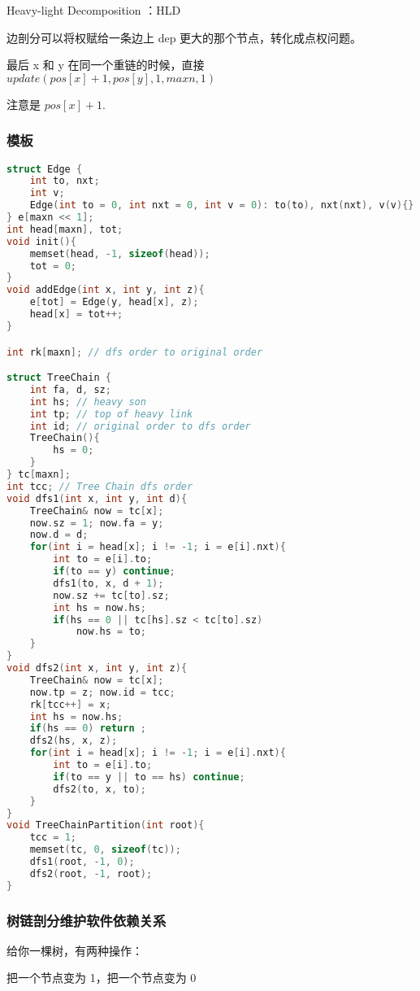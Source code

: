 Heavy-light Decomposition ：HLD

边剖分可以将权赋给一条边上 dep 更大的那个节点，转化成点权问题。

最后 x 和 y 在同一个重链的时候，直接 $update(pos[x] + 1 ,  pos[y], 1,  maxn, 1)$

注意是 $pos[x] + 1$.

\subsubsection{模板}

\begin{lstlisting}[language=C++]
struct Edge {
    int to, nxt;
    int v;
    Edge(int to = 0, int nxt = 0, int v = 0): to(to), nxt(nxt), v(v){}
} e[maxn << 1];
int head[maxn], tot;
void init(){
    memset(head, -1, sizeof(head));
    tot = 0;
}
void addEdge(int x, int y, int z){
    e[tot] = Edge(y, head[x], z);
    head[x] = tot++;
}

int rk[maxn]; // dfs order to original order

struct TreeChain {
    int fa, d, sz;
    int hs; // heavy son
    int tp; // top of heavy link
    int id; // original order to dfs order
    TreeChain(){
        hs = 0;
    }
} tc[maxn];
int tcc; // Tree Chain dfs order
void dfs1(int x, int y, int d){
    TreeChain& now = tc[x];
    now.sz = 1; now.fa = y;
    now.d = d;
    for(int i = head[x]; i != -1; i = e[i].nxt){
        int to = e[i].to;
        if(to == y) continue;
        dfs1(to, x, d + 1);
        now.sz += tc[to].sz;
        int hs = now.hs;
        if(hs == 0 || tc[hs].sz < tc[to].sz)
            now.hs = to;
    }
}
void dfs2(int x, int y, int z){
    TreeChain& now = tc[x];
    now.tp = z; now.id = tcc;
    rk[tcc++] = x;
    int hs = now.hs;
    if(hs == 0) return ;
    dfs2(hs, x, z);
    for(int i = head[x]; i != -1; i = e[i].nxt){
        int to = e[i].to;
        if(to == y || to == hs) continue;
        dfs2(to, x, to);
    }
}
void TreeChainPartition(int root){
    tcc = 1;
    memset(tc, 0, sizeof(tc));
    dfs1(root, -1, 0);
    dfs2(root, -1, root);
}
\end{lstlisting}

\subsubsection{树链剖分维护软件依赖关系}

给你一棵树，有两种操作：

把一个节点变为 1，把一个节点变为 0

